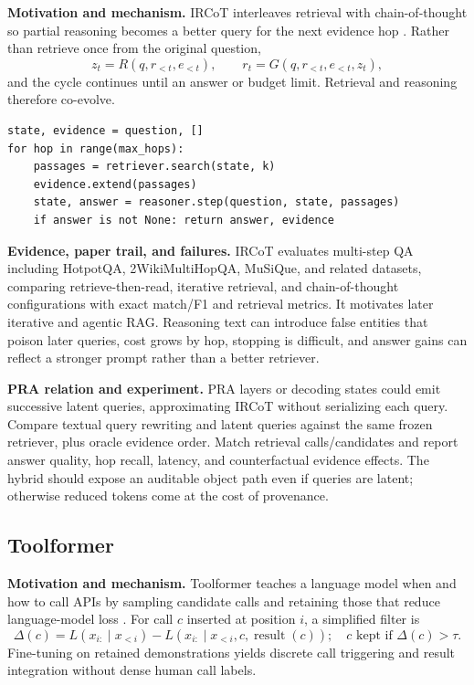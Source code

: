 \textbf{Motivation and mechanism.} IRCoT interleaves retrieval with chain-of-thought so
partial reasoning becomes a better query for the next evidence hop
\citep{trivedi2023ircot}.  Rather than retrieve once from the original question,
\begin{equation}
z_t=R(q,r_{<t},e_{<t}),\qquad
r_t=G(q,r_{<t},e_{<t},z_t),
\end{equation}
and the cycle continues until an answer or budget limit.  Retrieval and reasoning therefore
co-evolve.

\begin{lstlisting}[caption={IRCoT-style retrieval/reasoning alternation}]
state, evidence = question, []
for hop in range(max_hops):
    passages = retriever.search(state, k)
    evidence.extend(passages)
    state, answer = reasoner.step(question, state, passages)
    if answer is not None: return answer, evidence
\end{lstlisting}

\textbf{Evidence, paper trail, and failures.} IRCoT evaluates multi-step QA including
HotpotQA, 2WikiMultiHopQA, MuSiQue, and related datasets, comparing retrieve-then-read,
iterative retrieval, and chain-of-thought configurations with exact match/F1 and retrieval
metrics.  It motivates later iterative and agentic RAG.  Reasoning text can introduce false
entities that poison later queries, cost grows by hop, stopping is difficult, and answer
gains can reflect a stronger prompt rather than a better retriever.

\textbf{PRA relation and experiment.} PRA layers or decoding states could emit successive
latent queries, approximating IRCoT without serializing each query.  Compare textual query
rewriting and latent queries against the same frozen retriever, plus oracle evidence order.
Match retrieval calls/candidates and report answer quality, hop recall, latency, and
counterfactual evidence effects.  The hybrid should expose an auditable object path even if
queries are latent; otherwise reduced tokens come at the cost of provenance.

\subsection{Toolformer}

\textbf{Motivation and mechanism.} Toolformer teaches a language model when and how to call
APIs by sampling candidate calls and retaining those that reduce language-model loss
\citep{schick2023toolformer}.  For call $c$ inserted at position $i$, a simplified filter is
\begin{equation}
\Delta(c)=L(x_{i:}\mid x_{<i})-L(x_{i:}\mid x_{<i},c,\operatorname{result}(c));
\quad c\text{ kept if }\Delta(c)>\tau.
\end{equation}
Fine-tuning on retained demonstrations yields discrete call triggering and result integration
without dense human call labels.


